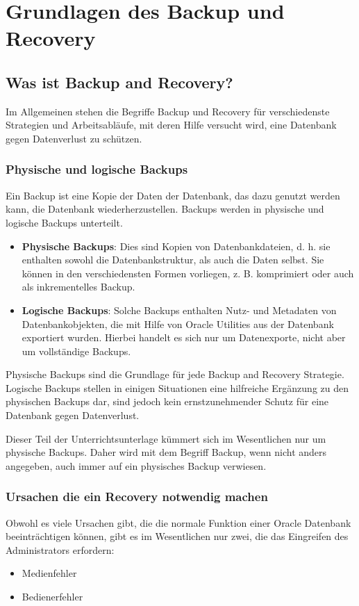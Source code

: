 \chapter{Grundlagen des Backup und Recovery}
\chaptertoc{}
\cleardoubleevenpage

    \section{Was ist Backup and Recovery?}
      Im Allgemeinen stehen die Begriffe Backup und Recovery für verschiedenste Strategien und Arbeitsabläufe, mit deren Hilfe versucht wird, eine Datenbank gegen Datenverlust zu schützen.
      \subsection{Physische und logische Backups}
        Ein Backup ist eine Kopie der Daten der Datenbank, das dazu genutzt werden kann, die Datenbank wiederherzustellen. Backups werden in physische und logische Backups unterteilt.
        \begin{itemize}
          \item \textbf{Physische Backups}: Dies sind Kopien von Datenbankdateien, d. h. sie enthalten sowohl die Datenbankstruktur, als auch die Daten selbst. Sie können in den verschiedensten Formen vorliegen, z. B. komprimiert oder auch als inkrementelles Backup.
          \item \textbf{Logische Backups}: Solche Backups enthalten Nutz- und Metadaten von Datenbank\-objekten, die mit Hilfe von Oracle Utilities aus der Datenbank exportiert wurden. Hierbei handelt es sich nur um Datenexporte, nicht aber um vollständige Backups.
        \end{itemize}
        Physische Backups sind die Grundlage für jede Backup and Recovery Strategie. Logische Backups stellen in einigen Situationen eine hilfreiche Ergänzung zu den physischen Backups dar, sind jedoch kein ernstzunehmender Schutz für eine Datenbank gegen Datenverlust.

        Dieser Teil der Unterrichtsunterlage kümmert sich im Wesentlichen nur um physische Backups. Daher wird mit dem Begriff Backup, wenn nicht anders angegeben, auch immer auf ein physisches Backup verwiesen.
      \subsection{Ursachen die ein Recovery notwendig machen}
        Obwohl es viele Ursachen gibt, die die normale Funktion einer Oracle Datenbank beeinträchtigen können, gibt es im Wesentlichen nur zwei, die das Eingreifen des Administrators erfordern:
        \begin{itemize}
          \item Medienfehler
          \item Bedienerfehler
        \end{itemize}
